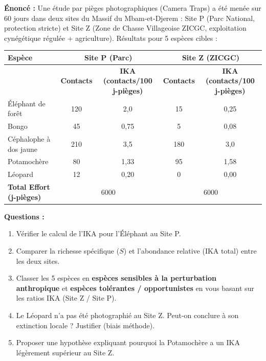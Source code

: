 \documentclass[11pt]{article}
\begin{document}
\begin{exoresolu}
    \textbf{Énoncé :} Une étude par pièges photographiques (Camera Traps) a été menée sur 60 jours dans deux sites du Massif du Mbam-et-Djerem : Site P (Parc National, protection stricte) et Site Z (Zone de Chasse Villageoise ZICGC, exploitation cynégétique régulée + agriculture). Résultats pour 5 espèces cibles :
    \begin{center}
    \begin{tabular}{|l|cc|cc|}\hline
    \rowcolor{poporangeL} \textbf{Espèce} & \multicolumn{2}{c|}{\textbf{Site P (Parc)}} & \multicolumn{2}{c|}{\textbf{Site Z (ZICGC)}} \\ \hline
    & \textbf{Contacts} & \textbf{IKA (contacts/100 j-pièges)} & \textbf{Contacts} & \textbf{IKA (contacts/100 j-pièges)} \\ \hline
    Éléphant de forêt & 120 & 2,0 & 15 & 0,25 \\ \hline
    Bongo & 45 & 0,75 & 5 & 0,08 \\ \hline
    Céphalophe à dos jaune & 210 & 3,5 & 180 & 3,0 \\ \hline
    Potamochère & 80 & 1,33 & 95 & 1,58 \\ \hline
    Léopard & 12 & 0,20 & 0 & 0,00 \\ \hline
    \textbf{Total Effort (j-pièges)} & \multicolumn{2}{c|}{6000} & \multicolumn{2}{c|}{6000} \\ \hline
    \end{tabular}
    \end{center}
    \textbf{Questions :}
    \begin{enumerate}
        \item Vérifier le calcul de l'IKA pour l'Éléphant au Site P.
        \item Comparer la richesse spécifique ($S$) et l'abondance relative (IKA total) entre les deux sites.
        \item Classer les 5 espèces en \textbf{espèces sensibles à la perturbation anthropique} et \textbf{espèces tolérantes / opportunistes} en vous basant sur les ratios IKA (Site Z / Site P).
        \item Le Léopard n'a pas été photographié au Site Z. Peut-on conclure à son extinction locale ? Justifier (biais méthode).
        \item Proposer une hypothèse expliquant pourquoi la Potamochère a un IKA légèrement supérieur au Site Z.
    \end{enumerate}

\end{exoresolu}
\end{document}
